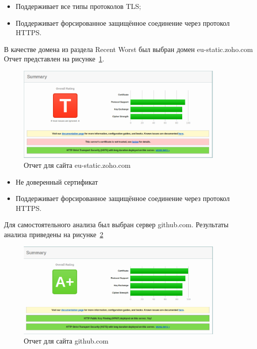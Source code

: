 \documentclass[10pt,a4paper]{report}
\begin{document}
			\begin{itemize}
				\item Поддерживает все типы протоколов TLS;
				\item Поддерживает форсированное защищённое соединение через протокол HTTPS.
			\end{itemize}
			
			В качестве домена из раздела Recent Worst был выбран домен 
			eu-static.zoho.com
			Отчет представлен на рисунке~\ref{ris:static}.
			
			\begin{figure}[h]
				\centering
				\includegraphics[width=0.9\textwidth]{pics/static.png}
				\caption{Отчет для сайта eu-static.zoho.com}
				\label{ris:static}
			\end{figure}
			
			\begin{itemize}
				\item Не доверенный сертификат
				\item Поддерживает форсированное защищённое соединение через протокол HTTPS.
			\end{itemize}
			
			Для самостоятельного анализа был выбран сервер github.com.
			Результаты анализа приведены на рисунке~\ref{ris:github}
			
			\begin{figure}[h]
				\centering
				\includegraphics[width=0.9\textwidth]{pics/github.png}
				\caption{Отчет для сайта github.com}
				\label{ris:github}
			\end{figure}
			
\end{document}
